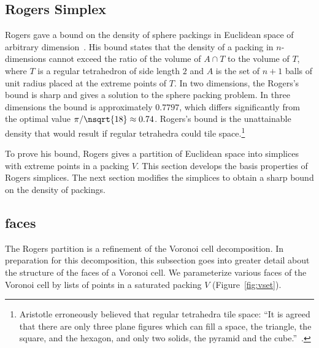 \begin{cnl}
\section{Rogers Simplex}\label{sec:rogers}

%
%

Rogers gave a bound on the density of sphere packings in Euclidean
space of arbitrary dimension~\cite{Rogers:1958:Packing}.  His bound
states that the density of a packing in $n$-dimensions cannot exceed
the ratio of the volume of $A \cap T$ to the volume of $T$, where $T$
is a regular tetrahedron of side length $2$ and $A$ is the set of
$n+1$ balls of unit radius placed at the extreme points of $T$.  In two
dimensions, the Rogers's bound is sharp and gives a solution to the
sphere packing problem.  In three dimensions the bound is
approximately $0.7797$, which differs significantly from the optimal
value $\pi/\nsqrt{18}\approx 0.74$.  Rogers's bound is the unattainable
density that would result if regular tetrahedra could tile
space.\footnote{Aristotle erroneously believed that regular tetrahedra
  tile space: ``It is agreed that there are only three plane figures
  which can fill a space, the triangle, the square, and the hexagon,
  and only two solids, the pyramid and the cube.''~\cite{Aristotle}.}
%
%
%

To prove his bound, Rogers gives a partition of Euclidean space into
simplices with extreme points in a packing $V$.  This section develops
the basis properties of Rogers simplices.  The next section modifies
the simplices to obtain a sharp bound on the density of packings.




\subsection{faces}\label{faces}

The Rogers partition is a refinement of the Voronoi cell decomposition.
In preparation for this decomposition, this subsection goes into
greater detail about the structure of the faces of a Voronoi cell.  We
parameterize various faces of the Voronoi cell by lists of points in a
saturated packing $V$ (Figure~\ref{fig:vset}).

\figKFETCJS %


\end{cnl}

